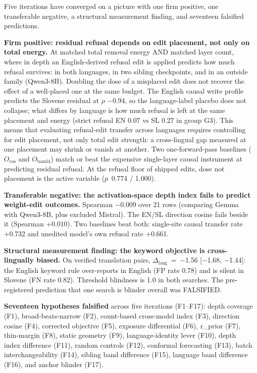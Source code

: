 \documentclass[11pt,letterpaper]{article}
\begin{document}
Five iterations have converged on a picture with one firm positive, one transferable negative, a structural measurement finding, and seventeen falsified predictions.

\textbf{Firm positive: residual refusal depends on edit placement, not only on total energy.} At matched total removal energy AND matched layer count, where in depth an English-derived refusal edit is applied predicts how much refusal survives: in both languages, in two sibling checkpoints, and in an outside family (Qwen3-8B). Doubling the dose of a misplaced edit does not recover the effect of a well-placed one at the same budget. The English causal write profile predicts the Slovene residual at $\rho$ $-$0.94, so the language-label placebo does not collapse; what differs by language is how much refusal is left at the same placement and energy (strict refusal EN 0.07 vs SL 0.27 in group G3). This means that evaluating refusal-edit transfer across languages requires controlling for edit placement, not only total edit strength: a cross-lingual gap measured at one placement may shrink or vanish at another. Two one-forward-pass baselines ($O_\mathrm{cos}$ and $O_\mathrm{band4}$) match or beat the expensive single-layer causal instrument at predicting residual refusal. At the refusal floor of shipped edits, dose not placement is the active variable ($p$~0.774 / 1.000).

\textbf{Transferable negative: the activation-space depth index fails to predict weight-edit outcomes.} Spearman $-$0.009 over 21 rows (comparing Gemma with Qwen3-8B, plus excluded Mistral). The EN/SL direction cosine fails beside it (Spearman +0.010). Two baselines beat both: single-site causal transfer rate +0.732 and unedited model's own refusal rate +0.661.

\textbf{Structural measurement finding: the keyword objective is cross-lingually biased.} On verified translation pairs, $\Delta_\mathrm{lang}$~=~$-$1.56 [$-$1.68, $-$1.44]: the English keyword rule over-reports in English (FP rate 0.78) and is silent in Slovene (FN rate 0.82). Threshold blindness is 1.0 in both searches. The pre-registered prediction that one search is blinder overall was FALSIFIED.

\textbf{Seventeen hypotheses falsified} across five iterations (F1--F17): depth coverage (F1), broad-beats-narrow (F2), count-based cross-model index (F3), direction cosine (F4), corrected objective (F5), exposure differential (F6), r\_prior (F7), thin-margin (F8), static geometry (F9), language-identity lever (F10), depth index difference (F11), random controls (F12), conformal forecasting (F13), batch interchangeability (F14), sibling band difference (F15), language band difference (F16), and anchor blinder (F17).
\end{document}
